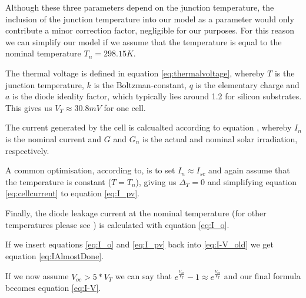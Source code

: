 \begin{minipage}{0.7\textwidth}
    Although these  three parameters depend  on the junction  temperature, the
    inclusion  of the  junction  temperature  into our  model  as a  parameter
    would  only  contribute a  minor  correction  factor, negligible  for  our
    purposes.  For this reason we can simplify our model if we assume that the
    temperature is equal to the nominal temperature $T_n = 298.15K$.

    The  thermal  voltage  is  defined  in  equation  \ref{eq:thermalvoltage},
    whereby $T$ is the junction temperature, $k$ is the Boltzman-constant, $q$
    is  the elementary  charge and  $a$ is  the diode  ideality factor,  which
    typically  lies around  1.2  for silicon  substrates. This  gives us  $V_T
    \approx 30.8mV$ for one cell.

    The  current generated  by the  cell is  calcualted according  to equation
    \label{eq:cellcurrent}, whereby $I_n$  is the nominal current  and $G$ and
    $G_n$ is the actual and nominal solar irradiation, respectively.

    A  common optimisation,  according to\cite{ref:villa:pvmodel},  is to  set
    $I_n \approx  I_{sc}$ and  again assume that  the temperature  is constant
    ($T  =  T_n$),   giving  us  $\Delta_T  =  0$   and  simplifying  equation
    \ref{eq:cellcurrent} to equation \ref{eq:I_pv}.

    Finally, the diode  leakage current at the nominal  temperature (for other
    temperatures  please  see  \cite{ref:villa:pvmodel})  is  calculated  with
    equation \ref{eq:I_o}.

    If  we  insert  equations  \eqref{eq:I_o} and  \eqref{eq:I_pv}  back  into
    \eqref{eq:I-V_old} we get equation \ref{eq:IAlmostDone}.

    If   we   now   assume   $V_{oc}   >   5  *   V_T$   we   can   say   that
    $e^{\frac{V_{oc}}{V_T}}-1  \approx e^{\frac{V_{oc}}{V_T}}$  and our  final
    formula becomes equation \eqref{eq:I-V}.
\end{minipage}
